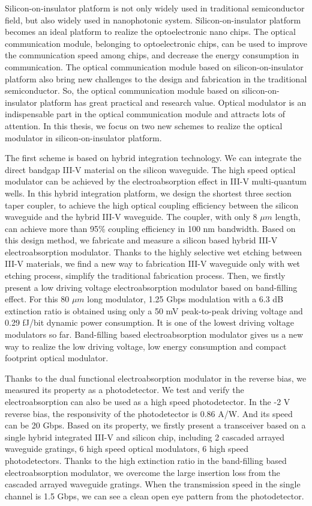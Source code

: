 \begin{englishabstract}
Silicon-on-insulator platform is not only widely used in traditional semiconductor field, but also widely used in nanophotonic system. Silicon-on-insulator platform becomes an ideal platform to realize the optoelectronic nano chips. The optical communication module, belonging to optoelectronic chips, can be used to improve the communication speed among chips, and decrease the energy consumption in communication. The optical communication module based on silicon-on-insulator platform also bring new challenges to the design and fabrication in the traditional semiconductor. So, the optical communication module based on silicon-on-insulator platform has great practical and research value. Optical modulator is an indispensable part in the optical communication module and attracts lots of attention. In this thesis, we focus on two new schemes to realize the optical modulator in silicon-on-insulator platform.

The first scheme is based on hybrid integration technology. We can integrate the direct bandgap III-V material on the silicon waveguide. The high speed optical modulator can be achieved by the electroabsorption effect in III-V multi-quantum wells. In this hybrid integration platform, we design the shortest three section taper coupler, to achieve the high optical coupling efficiency between the silicon waveguide and the hybrid III-V waveguide. The coupler, with only 8 $\mu m$ length, can achieve more than 95\% coupling efficiency in 100 nm bandwidth. Based on this design method, we fabricate and measure a silicon based hybrid III-V electroabsorption modulator. Thanks to the highly selective wet etching between III-V materials, we find a new way to fabrication III-V waveguide only with wet etching process, simplify the traditional  fabrication process. Then, we firstly present a low driving voltage electroabsorption modulator based on band-filling effect. For this 80 $\mu m$ long modulator, 1.25 Gbps modulation with a 6.3 dB extinction ratio is obtained using only a 50 mV peak-to-peak driving voltage and 0.29 fJ/bit dynamic power consumption. It is one of the lowest driving voltage modulators so far. Band-filling based electroabsorption modulator gives us a new way to realize the low driving voltage, low energy consumption and compact footprint optical modulator.

Thanks to the dual functional  electroabsorption modulator in the reverse bias, we measured its property as a photodetector. We test and verify the electroabsorption can also be used as a high speed photodetector. In the -2 V reverse bias, the responsivity of the photodetector is 0.86 A/W. And its speed can be 20 Gbps. Based on its property, we firstly present a transceiver based on a single hybrid integrated III-V and silicon chip, including 2 cascaded arrayed waveguide gratings, 6 high speed optical modulators, 6 high speed photodetectors. Thanks to the high extinction ratio in the band-filling based electroabsorption modulator, we overcome the large insertion loss from the cascaded arrayed waveguide gratings. When the transmission speed in the single channel is 1.5 Gbps, we can see a clean open eye pattern from the photodetector.


\end{englishabstract}
